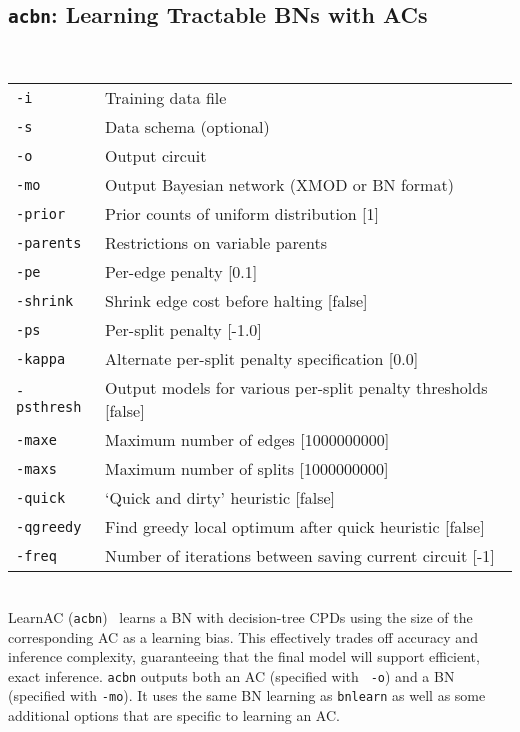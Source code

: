\documentclass[11pt]{article}
\newcommand{\pedram}[1]{\textcolor{blue}{\emph{[Pedram: #1]}}}
\begin{document}

\subsection{{\tt acbn}: Learning Tractable BNs with ACs} \label{sec:acbn}

\noindent {} \\
\begin{tabular}{ll}
{\tt -i} &         Training data file \\
{\tt -s} &         Data schema (optional) \\
{\tt -o} &         Output circuit \\
{\tt -mo} &        Output Bayesian network (XMOD or BN format) \\
{\tt -prior} &     Prior counts of uniform distribution [1] \\
{\tt -parents} &   Restrictions on variable parents \\
{\tt -pe} &        Per-edge penalty [0.1] \\
{\tt -shrink} &    Shrink edge cost before halting [false] \\
{\tt -ps} &        Per-split penalty [-1.0] \\
{\tt -kappa} &     Alternate per-split penalty specification [0.0] \\
{\tt -psthresh} &  Output models for various per-split penalty thresholds [false] \\
{\tt -maxe} &      Maximum number of edges [1000000000] \\
{\tt -maxs} &      Maximum number of splits [1000000000] \\
{\tt -quick} &     `Quick and dirty' heuristic [false] \\
{\tt -qgreedy} &   Find greedy local optimum after quick heuristic [false] \\
{\tt -freq} &      Number of iterations between saving current circuit [-1] \\
\end{tabular} \\


LearnAC ({\tt acbn})~\cite{lowd&domingos08} learns a BN with
decision-tree CPDs using the size of the corresponding AC as a
learning bias.  This effectively trades off accuracy and inference
complexity, guaranteeing that the final model will support efficient,
exact inference.  {\tt acbn} outputs both an AC (specified with {\tt
-o}) and a BN (specified with {\tt -mo}). It uses the same BN learning
as {\tt bnlearn} as well as some additional options that are specific
to learning an AC.
\end{document}
